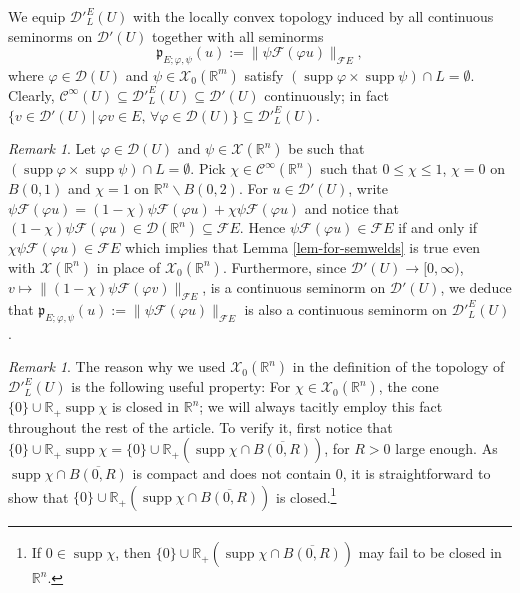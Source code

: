 \documentclass[12pt,reqno]{amsart}
\newcommand{\RR}{\mathbb R}
\newcommand{\DD}{\mathcal D}
\newcommand{\XX}{\mathcal X}
\newcommand{\supp}{\operatorname{supp}}
\theoremstyle{plain}
\theoremstyle{remark}
\newtheorem{remark}[theorem]{Remark}
\theoremstyle{definition}
\numberwithin{equation}{section}
\begin{document}
We equip $\DD'^E_L(U)$ with the locally convex topology induced by all continuous seminorms on $\DD'(U)$ together with all seminorms
\begin{equation}
\label{seminorm}
\mathfrak{p}_{E;\varphi,\psi}(u):=\|\psi\mathcal{F}(\varphi u)\|_{\mathcal F E},
\end{equation}
where $\varphi\in \DD(U)$ and $\psi\in\XX_0(\RR^m)$ satisfy $(\supp\varphi\times\supp\psi)\cap L=\emptyset$. Clearly, $\mathcal{C}^{\infty}(U)\subseteq \DD'^E_{L}(U)\subseteq \DD'(U)$ continuously; in fact $\{v\in\DD'(U)\,|\, \varphi v\in E,\, \forall\varphi\in \DD(U)\}\subseteq \DD'^E_L(U)$.

\begin{remark}
Let $\varphi\in\DD(U)$ and $\psi\in\XX(\RR^n)$ be such that $(\supp\varphi\times\supp\psi)\cap L=\emptyset$. Pick $\chi\in\mathcal{C}^{\infty}(\RR^n)$ such that $0\leq \chi\leq1$, $\chi=0$ on $B(0,1)$ and $\chi=1$ on $\RR^n\backslash B(0,2)$. For $u\in\DD'(U)$, write $\psi\mathcal{F}(\varphi u)=(1-\chi)\psi\mathcal{F}(\varphi u)+\chi\psi\mathcal{F}(\varphi u)$ and notice that $(1-\chi)\psi\mathcal{F}(\varphi u)\in\DD(\RR^n)\subseteq \mathcal{F}E$. Hence $\psi\mathcal{F}(\varphi u)\in\mathcal{F}E$ if and only if $\chi\psi\mathcal{F}(\varphi u)\in\mathcal{F}E$ which implies that Lemma \ref{lem-for-semwelds} is true even with $\XX(\RR^n)$ in place of $\XX_0(\RR^n)$. Furthermore, since $\DD'(U)\rightarrow [0,\infty)$, $v\mapsto \|(1-\chi)\psi\mathcal{F}(\varphi v)\|_{\mathcal{F}E}$, is a continuous seminorm on $\DD'(U)$, we deduce that $\mathfrak{p}_{E;\varphi,\psi}(u):=\|\psi\mathcal{F}(\varphi u)\|_{\mathcal F E}$ is also a continuous seminorm on $\DD'^E_L(U)$.
\end{remark}

\begin{remark}
The reason why we used $\XX_0(\RR^n)$ in the definition of the topology of $\DD'^E_L(U)$ is the following useful property: For $\chi\in\XX_0(\RR^n)$, the cone $\{0\}\cup\RR_+\supp\chi$ is closed in $\RR^n$; we will always tacitly employ this fact throughout the rest of the article. To verify it, first notice that $\{0\}\cup\RR_+\supp\chi=\{0\}\cup\RR_+(\supp\chi\cap \overline{B(0,R)})$, for $R>0$ large enough. As $\supp\chi\cap \overline{B(0,R)}$ is compact and does not contain $0$, it is straightforward to show that $\{0\}\cup\RR_+(\supp\chi\cap \overline{B(0,R)})$ is closed.\footnote{If $0\in\supp\chi$, then $\{0\}\cup\RR_+(\supp\chi\cap \overline{B(0,R)})$ may fail to be closed in $\RR^n$.}
\end{remark}
\end{document}
